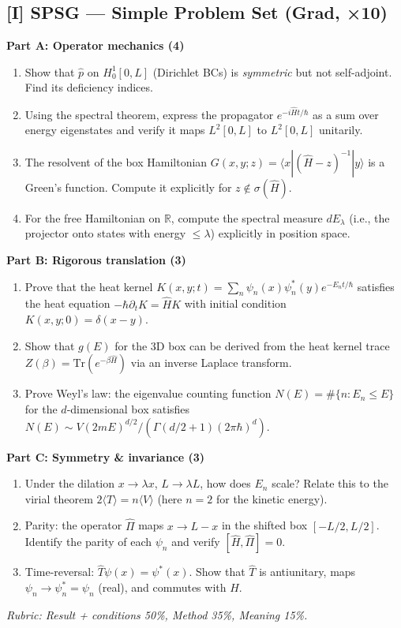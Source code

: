 \subsection*{[I] SPSG — Simple Problem Set (Grad, ×10)}
\begin{tcolorbox}[gradprobbox, title={SPSG · L01 · Tiers 4–5 · 60–90 min}]
\textbf{Part A: Operator mechanics (4)}
\begin{enumerate}[label=\textbf{P\arabic*.}]
  \item Show that $\hat{p}$ on $H^1_0[0,L]$ (Dirichlet BCs) is \emph{symmetric} but not self-adjoint. Find its deficiency indices.
  \item Using the spectral theorem, express the propagator $e^{-i\hat{H}t/\hbar}$ as a sum over energy eigenstates and verify it maps $L^2[0,L]$ to $L^2[0,L]$ unitarily.
  \item The resolvent of the box Hamiltonian $G(x,y;z) = \langle x|(\hat{H}-z)^{-1}|y\rangle$ is a Green's function. Compute it explicitly for $z\notin\sigma(\hat{H})$.
  \item For the free Hamiltonian on $\mathbb{R}$, compute the spectral measure $dE_\lambda$ (i.e., the projector onto states with energy $\leq\lambda$) explicitly in position space.
\end{enumerate}
\textbf{Part B: Rigorous translation (3)}
\begin{enumerate}[label=\textbf{P\arabic*.},resume]
  \item Prove that the heat kernel $K(x,y;t) = \sum_n \psi_n(x)\psi_n^*(y)e^{-E_nt/\hbar}$ satisfies the heat equation $-\hbar\partial_t K = \hat{H}K$ with initial condition $K(x,y;0) = \delta(x-y)$.
  \item Show that $g(E)$ for the 3D box can be derived from the heat kernel trace $Z(\beta) = \mathrm{Tr}(e^{-\beta\hat{H}})$ via an inverse Laplace transform.
  \item Prove Weyl's law: the eigenvalue counting function $N(E) = \#\{n: E_n\leq E\}$ for the $d$-dimensional box satisfies $N(E) \sim V(2mE)^{d/2}/(\Gamma(d/2+1)(2\pi\hbar)^d)$.
\end{enumerate}
\textbf{Part C: Symmetry \& invariance (3)}
\begin{enumerate}[label=\textbf{P\arabic*.},resume]
  \item Under the dilation $x\to\lambda x$, $L\to\lambda L$, how does $E_n$ scale? Relate this to the virial theorem $2\langle T\rangle = n\langle V\rangle$ (here $n=2$ for the kinetic energy).
  \item Parity: the operator $\hat{\Pi}$ maps $x\to L-x$ in the shifted box $[-L/2,L/2]$. Identify the parity of each $\psi_n$ and verify $[\hat{H},\hat{\Pi}]=0$.
  \item Time-reversal: $\hat{T}\psi(x) = \psi^*(x)$. Show that $\hat{T}$ is antiunitary, maps $\psi_n\to\psi_n^*=\psi_n$ (real), and commutes with $\hat{H}$.
\end{enumerate}
\textit{Rubric: Result + conditions 50\%, Method 35\%, Meaning 15\%.}
\end{tcolorbox}

